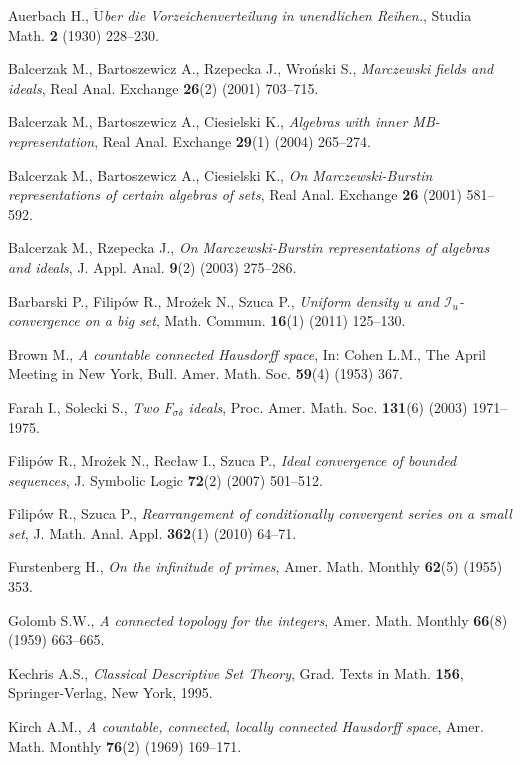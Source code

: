 \documentclass{amsart}
\theoremstyle{definition}
\newcommand{\I}{\mathcal I}
\begin{document}
\begin{thebibliography}{abc}

Auerbach H., \emph{$\ddot{\textrm{U}}$ber die Vorzeichenverteilung in unendlichen Reihen.},
Studia Math. {\bf 2} (1930) 228--230.

Balcerzak M., Bartoszewicz A., Rzepecka J., Wro\'nski S., \emph{Marczewski fields and ideals},
Real Anal. Exchange {\bf 26}(2) (2001) 703--715.

Balcerzak M., Bartoszewicz A., Ciesielski K., \emph{Algebras with inner MB-representation},
Real Anal. Exchange {\bf 29}(1) (2004) 265--274.

Balcerzak M., Bartoszewicz A., Ciesielski K., \emph{On Marczewski-Burstin representations of certain algebras of sets},
Real Anal. Exchange {\bf 26} (2001) 581--592.

Balcerzak M., Rzepecka J., \emph{On Marczewski-Burstin representations of algebras and ideals},
J. Appl. Anal. {\bf 9}(2) (2003) 275--286.

Barbarski P., Filip\'ow R., Mro\.zek N., Szuca P., \emph{Uniform density $u$ and $\I_u$-convergence on a big set},
Math. Commun. {\bf 16}(1) (2011) 125--130.

Brown M., \emph{A countable connected Hausdorff space},
In: Cohen L.M., The April Meeting in New York, Bull. Amer. Math. Soc. {\bf 59}(4) (1953) 367.

Farah I., Solecki S., \emph{Two $F_{\sigma\delta}$ ideals},
Proc. Amer. Math. Soc. {\bf 131}(6) (2003) 1971--1975.

Filip\'ow R., Mro\.zek N., Rec\l{}aw I., Szuca P., \emph{Ideal convergence of bounded sequences},
J. Symbolic Logic {\bf 72}(2) (2007) 501--512.

Filip\'ow R., Szuca P., \emph{Rearrangement of conditionally convergent series on a small set},
J. Math. Anal. Appl. {\bf 362}(1) (2010) 64--71.

Furstenberg H., \emph{On the infinitude of primes},
Amer. Math. Monthly {\bf 62}(5) (1955) 353.

Golomb S.W., \emph{A connected topology for the integers},
Amer. Math. Monthly {\bf 66}(8) (1959) 663--665.

Kechris A.S., \emph{Classical Descriptive Set Theory},
Grad. Texts in Math. {\bf 156}, Springer-Verlag, New York, 1995.

Kirch A.M., \emph{A countable, connected, locally connected Hausdorff space},
Amer. Math. Monthly {\bf 76}(2) (1969) 169--171.


\end{thebibliography}
\end{document}
